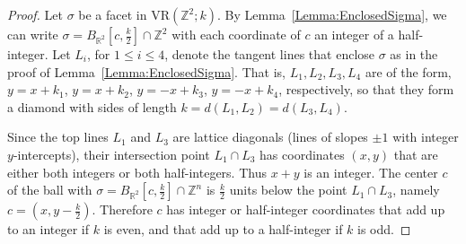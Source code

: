 \documentclass[12pt,a4paper]{amsart}
\newcommand\edge{\mathrel{\boldsymbol{\cdot}\mkern-4mu{-}\mkern-4mu\boldsymbol{\cdot}}}
\theoremstyle{definition}
\newcommand{\R}{\ensuremath{\mathbb{R}}}
\newcommand{\Z}{\ensuremath{\mathbb{Z}}}
\newcommand{\vr}[2]{\mathrm{VR}(#1;#2)}
\numberwithin{equation}{section}
\begin{document}
\begin{proof}
Let $\sigma$ be a facet in $\vr{\Z^2}{k}$.
By Lemma~\ref{Lemma:EnclosedSigma}, we can write $\sigma = B_{\R^2}[c,\frac{k}{2}] \cap \Z^2$ with each coordinate of $c$ an integer of a half-integer.
Let $L_i$, for $1\leq i \leq 4$, denote the tangent lines that enclose $\sigma$ as in the proof of Lemma~\ref{Lemma:EnclosedSigma}.
That is, $L_1, L_2, L_3, L_4$ are of the form, $y=x+k_1$, $y=x+k_2$, $y=-x+k_3$, $y=-x+k_4$, respectively, so that they form a diamond with sides of length $k = d(L_1, L_2) = d(L_3, L_4)$.



Since the top lines $L_1$ and $L_3$ are lattice diagonals (lines of slopes $\pm 1$ with integer $y$-intercepts), their intersection point $L_1\cap L_3$ has coordinates $(x,y)$ that are either both integers or both half-integers.
Thus $x+y$ is an integer.
The center $c$ of the ball with $\sigma=B_{\R^2}[c,\frac{k}{2}]\cap\Z^n$ is $\frac{k}{2}$ units below the point $L_1\cap L_3$, namely $c=(x,y-\frac{k}{2})$.
Therefore $c$ has integer or half-integer coordinates that add up to an integer if $k$ is even, and that add up to a half-integer if $k$ is odd.
\end{proof}
\end{document}
